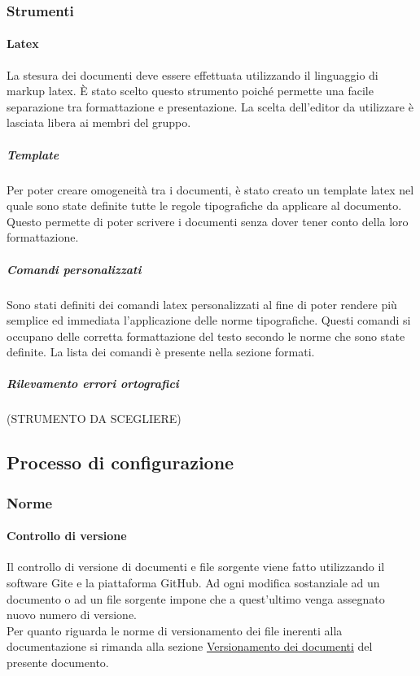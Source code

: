 \documentclass[../NormeProgetto.tex]{subfiles}
\begin{document}
	\subsubsection{Strumenti}
		\paragraph{Latex}
		La stesura dei documenti deve essere effettuata utilizzando il linguaggio di markup latex. È stato scelto questo strumento poiché permette una facile separazione tra formattazione e presentazione. La scelta dell'editor da utilizzare è lasciata libera ai membri del gruppo.
		
			\subparagraph{Template}
			Per poter creare omogeneità tra i documenti, è stato creato un template latex nel quale sono state definite tutte le regole tipografiche da applicare al documento. Questo permette di poter scrivere i documenti senza dover tener conto della loro formattazione.
			\subparagraph{Comandi personalizzati}
			Sono stati definiti dei comandi latex personalizzati al fine di poter rendere più semplice ed immediata l'applicazione delle norme tipografiche. Questi comandi si occupano delle corretta formattazione del testo secondo le norme che sono state definite. La lista dei comandi è presente nella sezione formati.
			\subparagraph{Rilevamento errori ortografici}
			(STRUMENTO DA SCEGLIERE)

\subsection{Processo di configurazione}
	\subsubsection{Norme}
	\paragraph{Controllo di versione}

	Il controllo di versione di documenti e file sorgente viene fatto utilizzando il software Gite e la piattaforma GitHub. Ad ogni modifica sostanziale ad un documento o ad un file sorgente impone che a quest'ultimo venga assegnato nuovo numero di versione. \\ Per quanto riguarda le norme di versionamento dei file inerenti alla documentazione si rimanda alla sezione \hyperref[sec:Versionamento dei documenti]{Versionamento dei documenti} del presente documento.
\end{document}
